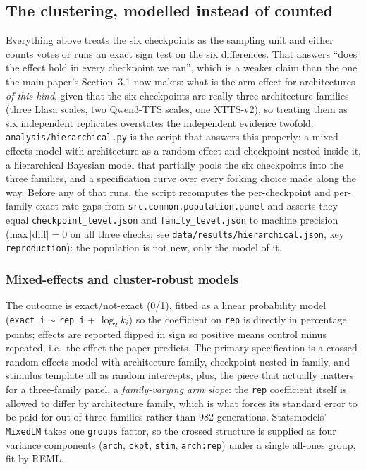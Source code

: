 \documentclass[11pt]{article}
\begin{document}
\subsection{The clustering, modelled instead of counted}
\label{sec:s11-hier}

Everything above treats the six checkpoints as the sampling unit and either
counts votes or runs an exact sign test on the six differences. That answers
``does the effect hold in every checkpoint we ran'', which is a weaker claim
than the one the main paper's Section~3.1 now makes: what is the arm effect
for architectures \emph{of this kind}, given that the six checkpoints are
really three architecture families (three Llasa scales, two Qwen3-TTS scales,
one XTTS-v2), so treating them as six independent replicates overstates the
independent evidence twofold. \texttt{analysis/hierarchical.py} is the script
that answers this properly: a mixed-effects model with architecture as a
random effect and checkpoint nested inside it, a hierarchical Bayesian model
that partially pools the six checkpoints into the three families, and a
specification curve over every forking choice made along the way. Before any
of that runs, the script recomputes the per-checkpoint and per-family exact-rate
gaps from \texttt{src.common.population.panel} and asserts they equal
\texttt{checkpoint\_level.json} and \texttt{family\_level.json} to machine
precision (max\,$|$diff$|=0$ on all three checks; see
\texttt{data/results/hierarchical.json}, key \texttt{reproduction}): the
population is not new, only the model of it.

\subsubsection{Mixed-effects and cluster-robust models}

The outcome is exact/not-exact (0/1), fitted as a linear probability model
(\texttt{exact\_i} $\sim$ \texttt{rep\_i} + $\log_2 k_i$) so the coefficient on
\texttt{rep} is directly in percentage points; effects are reported flipped in
sign so positive means control minus repeated, i.e.\ the effect the paper
predicts. The primary specification is a crossed-random-effects model with
architecture family, checkpoint nested in family, and stimulus template all as
random intercepts, plus, the piece that actually matters for a three-family
panel, a \emph{family-varying arm slope}: the \texttt{rep} coefficient itself
is allowed to differ by architecture family, which is what forces its standard
error to be paid for out of three families rather than 982 generations.
Statsmodels' \texttt{MixedLM} takes one \texttt{groups} factor, so the crossed
structure is supplied as four variance components (\texttt{arch},
\texttt{ckpt}, \texttt{stim}, \texttt{arch:rep}) under a single all-ones group,
fit by REML.
\end{document}
